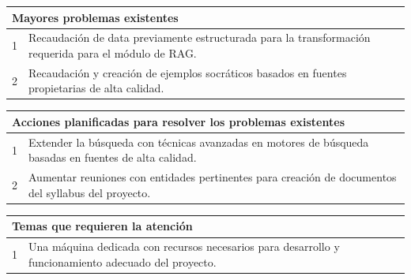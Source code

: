 \documentclass[12pt]{article}
\begin{document}
\vspace{1em}

\begin{table}[h]
    \begin{tabularx}{\textwidth}{|l|X|}
        \hline
        \multicolumn{2}{|l|}{\textbf{Mayores problemas existentes}} \\
        \hline
        1 & Recaudación de data previamente estructurada para la transformación requerida para el módulo de RAG. \\
        \hline
        2 & Recaudación y creación de ejemplos socráticos basados en fuentes propietarias de alta calidad. \\
        \hline
    \end{tabularx}
\end{table}

\vspace{1em}

\begin{table}[h]
    \begin{tabularx}{\textwidth}{|l|X|}
        \hline
        \multicolumn{2}{|l|}{\textbf{Acciones planificadas para resolver los problemas existentes}} \\
        \hline
        1 & Extender la búsqueda con técnicas avanzadas en motores de búsqueda basadas en fuentes de alta calidad. \\
        \hline
        2 & Aumentar reuniones con entidades pertinentes para creación de documentos del syllabus del proyecto. \\
        \hline
    \end{tabularx}
\end{table}

\vspace{1em}

\begin{table}[h]
    \begin{tabularx}{\textwidth}{|l|X|}
        \hline
        \multicolumn{2}{|l|}{\textbf{Temas que requieren la atención}} \\
        \hline
        1 & Una máquina dedicada con recursos necesarios para desarrollo y funcionamiento adecuado del proyecto. \\
        \hline
    \end{tabularx}
\end{table}

\newpage
\end{document}
